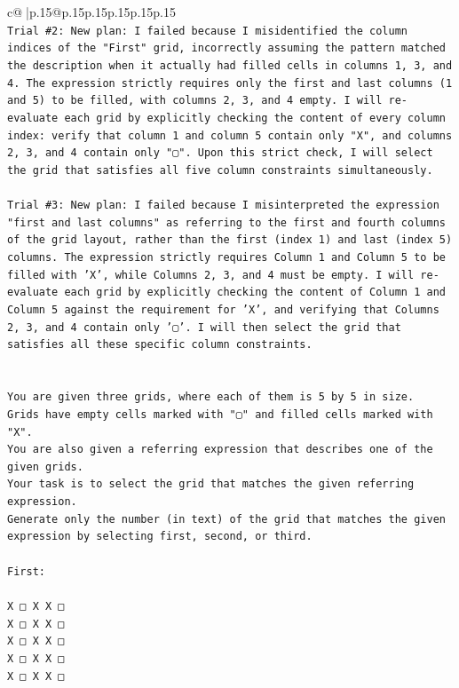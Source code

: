 \documentclass{article}
\begin{document}
{\begin{supertabular}{c@{$\;$}|p{.15\linewidth}@{}p{.15\linewidth}p{.15\linewidth}p{.15\linewidth}p{.15\linewidth}p{.15\linewidth}}
{{{\\ 
\texttt{Trial \#2: New plan: I failed because I misidentified the column indices of the "First" grid, incorrectly assuming the pattern matched the description when it actually had filled cells in columns 1, 3, and 4. The expression strictly requires only the first and last columns (1 and 5) to be filled, with columns 2, 3, and 4 empty. I will re{-}evaluate each grid by explicitly checking the content of every column index: verify that column 1 and column 5 contain only "X", and columns 2, 3, and 4 contain only "▢". Upon this strict check, I will select the grid that satisfies all five column constraints simultaneously.} \\
\\ 
\texttt{Trial \#3: New plan: I failed because I misinterpreted the expression "first and last columns" as referring to the first and fourth columns of the grid layout, rather than the first (index 1) and last (index 5) columns. The expression strictly requires Column 1 and Column 5 to be filled with 'X', while Columns 2, 3, and 4 must be empty. I will re{-}evaluate each grid by explicitly checking the content of Column 1 and Column 5 against the requirement for 'X', and verifying that Columns 2, 3, and 4 contain only '▢'. I will then select the grid that satisfies all these specific column constraints.} \\
\\ 
\\ 
\texttt{You are given three grids, where each of them is 5 by 5 in size.} \\
\texttt{Grids have empty cells marked with "▢" and filled cells marked with "X".} \\
\texttt{You are also given a referring expression that describes one of the given grids.} \\
\texttt{Your task is to select the grid that matches the given referring expression.} \\
\texttt{Generate only the number (in text) of the grid that matches the given expression by selecting first, second, or third.} \\
\\ 
\texttt{First:} \\
\\ 
\texttt{X □ X X □} \\
\texttt{X □ X X □} \\
\texttt{X □ X X □} \\
\texttt{X □ X X □} \\
\texttt{X □ X X □} \\
}}}
\end{supertabular}}
\end{document}
